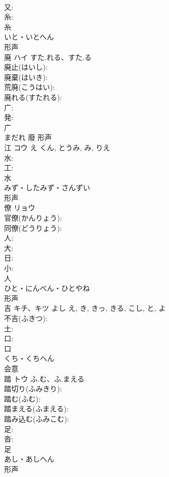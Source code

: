 \documentclass[8pt]{extreport}
\begin{document}
\begin{CJK}{UTF8}{min}
\\	又: 
\\	糸: 
\\	糸	
\\	いと・いとへん	
\\	形声 
\\	廃	ハイ	すた.れる、すた.る		
\\	廃止(はいし): 
\\	廃棄(はいき): 
\\	荒廃(こうはい): 
\\	廃れる(すたれる): 
\\	广: 
\\	発: 
\\	广	
\\	まだれ	廢	形声 
\\	江	コウ	え	くん, とうみ, み, りえ	
\\	水: 
\\	工: 
\\	水	
\\	みず・したみず・さんずい	
\\	形声 
\\	僚	リョウ			
\\	官僚(かんりょう): 
\\	同僚(どうりょう): 
\\	人: 
\\	大: 
\\	日: 
\\	小: 
\\	人	
\\	ひと・にんべん・ひとやね	
\\	形声 
\\	吉	キチ、キツ	よし	え, き, きっ, きる, こし, と, よ	
\\	不吉(ふきつ): 
\\	土: 
\\	口: 
\\	口	
\\	くち・くちへん	
\\	会意 
\\	踏	トウ	ふ.む、ふ.まえる		
\\	踏切り(ふみきり): 
\\	踏む(ふむ): 
\\	踏まえる(ふまえる): 
\\	踏み込む(ふみこむ): 
\\	足: 
\\	沓: 
\\	足	
\\	あし・あしへん	
\\	形声 

\end{CJK}
\end{document}
